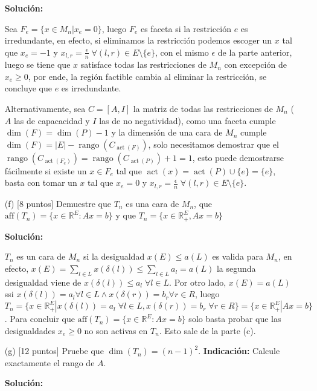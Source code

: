 \documentclass{article}
\newcommand{\RR}{\mathbb R}
\DeclareMathOperator{\act}{act}
\newcommand{\rango}{\operatorname{rango}}
\theoremstyle{plain}
\theoremstyle{definition}
\theoremstyle{Azul}
\begin{document}
\begin{enumerate}
\textbf{Solución:}

Sea $F_{e} = \{x\in M_{n}|x_{e}=0\}$, luego $F_{e}$ es faceta si la restricción $e$ es irredundante, en efecto, si eliminamos la restricción podemos escoger un $x$ tal que $x_{e}=-1$ y $x_{l,r}=\frac{\epsilon}{n} \; \forall (l,r)\in E\setminus\{e\}$, con el mismo $\epsilon$ de la parte anterior, luego se tiene que $x$ satisface todas las restricciones de $M_{n}$ con excepción de $x_e\geq 0$, por ende, la región factible cambia al eliminar la restricción, se concluye que $e$ es irredundante.

Alternativamente, sea $C=[A,I]$ la matriz de todas las restricciones de $M_{n}$ ($A$ las de capacacidad y $I$ las de no negatividad), como una faceta cumple $\dim(F)=\dim(P)-1$ y la dimensión de una cara de $M_{n}$ cumple $\dim(F)=|E|-\rango(C_{\act(F)})$, solo necesitamos demostrar que el $\rango(C_{\act(F_{e})})=\rango(C_{\act(P)})+1=1$, esto puede demostrarse fácilmente si existe un $x\in F_{e}$ tal que $\act(x)=\act(P)\cup\{e\}=\{e\}$, basta con tomar un $x$ tal que $x_{e}=0$ y $x_{l,r}=\frac{\epsilon}{n} \;\forall (l,r) \in E \setminus \{e\}$.

\item[(f)] [8 puntos] Demuestre que $T_n$ es una cara de $M_n$, que $\text{aff}(T_n)=\{x\in \RR^E\colon Ax=b\}$ y que $T_n=\{x\in \RR^E_+, Ax=b\}$

\textbf{Solución:}

 $T_{n}$ es un cara de $M_n$ si la desigualdad $x(E)\leq a(L)$ es valida para $M_n$, en efecto, $x(E) = \sum_{l\in L}x(\delta(l))\leq \sum_{l\in L}a_{l}=a(L)$ la segunda desigualdad viene de $x(\delta(l))\leq a_{l} \; \forall l \in L$.
Por otro lado, $x(E)=a(L)$ ssi $x(\delta(l))=a_{l} \forall l \in L \wedge x(\delta(r))=b_{r} \forall r \in R$, luego $T_n = \{x\in\mathbb{R}^{E}_{+}|x(\delta(l))=a_{l} \; \forall l \in L, x(\delta(r))=b_{r} \; \forall r \in R\} = \{x\in\mathbb{R}^{E}_{+}|Ax=b\}$. Para concluir que $\text{aff}(T_n)=\{x\in \RR^E\colon Ax=b\}$ solo basta probar que las desigualdades $x_e\geq 0$ no son activas en $T_n$. Esto sale de la parte (c). \\

\item[(g)] [12 puntos] Pruebe que $\dim(T_n)=(n-1)^2$. \textbf{Indicación:} Calcule exactamente el rango de $A$.

\textbf{Solución:}


\end{enumerate}
\end{document}
